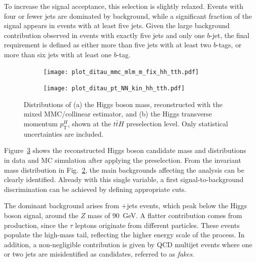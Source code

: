 To increase the signal acceptance, this selection is slightly relaxed. Events with four or fewer jets are dominated by background, while a significant fraction of the signal appears in events with at least five jets. 
Given the large background contribution observed in events with exactly five jets and only one $b$-jet, the final requirement is defined as either more than five jets with at least two $b$-tags, or more than six jets with at least one $b$-tag.

\begin{figure}[htbp]
    \centering
    \begin{subfigure}[b]{0.48\textwidth}
        \centering
        \texttt{[image: plot\_ditau\_mmc\_mlm\_m\_fix\_hh\_tth.pdf]}
        \caption{}
        \label{reconstructed_preselection_a}
    \end{subfigure}
    \hfill
    \begin{subfigure}[b]{0.48\textwidth}
        \centering
        \texttt{[image: plot\_ditau\_pt\_NN\_kin\_hh\_tth.pdf]}
        \caption{}
        \label{reconstructed_preselection_a}
    \end{subfigure}
    \caption{Distributions of (a) the Higgs boson mass, reconstructed with the mixed MMC/collinear estimator, and (b) the Higgs transverse momentum $p_{\text{T}}^H$, shown at the $t\bar{t}H$ preselection level. Only statistical uncertainties are included.}
    \label{reconstructed_preselection}
\end{figure}


Figure~\ref{reconstructed_preselection} shows the reconstructed Higgs boson candidate mass and \pth distributions in data and MC simulation after applying the preselection. 
From the invariant mass distribution in Fig.~\ref{reconstructed_preselection_a}, the main backgrounds affecting the analysis can be clearly identified. 
Already with this single variable, a first signal-to-background discrimination can be achieved by defining appropriate cuts. 

The dominant background arises from \ztautau$+$jets events, which peak below the Higgs boson signal, around the $Z$ mass of 90~GeV. 
A flatter contribution comes from \ttbar production, since the $\tau$ leptons originate from different particles. 
These events populate the high-mass tail, reflecting the higher energy scale of the process. In addition, a non-negligible contribution is given by QCD multijet events where one or two jets are misidentified as \tauhadvis candidates, referred to as \emph{fakes}. 

